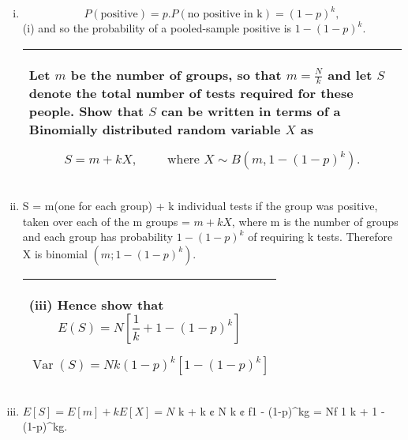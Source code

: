 \documentclass[a4paper,12pt]{article}
\begin{document}
\begin{enumerate}[(i)]
\item \[P(\mbox{positive})= p. P(\mbox{no positive in k})= (1-p)^k,\]
(i) and so the probability of a pooled-sample positive is $1 - (1-p)^k$.

  \begin{table}[ht!]
     \centering
     \begin{tabular}{|p{15cm}|}
     \hline  



Let $m$ be the number of groups, so that ${\displaystyle  m = \frac{N}{k}  }$
and let $S$ denote the total number of tests required for these people. 
Show that $S$ can be written in terms of a Binomially distributed random variable $X$ as

\[ S = m +kX, \qquad \mbox{ where } X \sim B(m,1-(1-p)^k ).\]


 \\ \hline 
      \end{tabular}
    \end{table}

    
\item S = m(one for each group) + k individual tests if the group was positive,
taken over each of the m groups = $m+kX$, where m is the number of groups
and each group has probability $1 - (1-p)^k$ of requiring k tests.
Therefore X is binomial $(m; 1 - (1-p)^k)$.


  \begin{table}[ht!]
     \centering
     \begin{tabular}{|p{15cm}|}
     \hline 
(iii) Hence show that
\[ E(S) = N \left[ \frac{1}{k} + 1-(1-p)^k \right] \]

\[ \operatorname{Var}(S) = Nk(1-p)^k \left[  1-(1-p)^k \right] \]

 \\ \hline 
      \end{tabular}
    \end{table}
\item $E[S] = E[m] + kE[X] = N$
k + k ¢ N
k ¢ f1 - (1-p)^kg = Nf 1
k + 1 - (1-p)^kg.







\end{enumerate}
\end{document}
